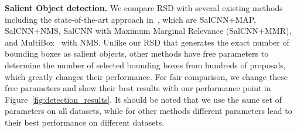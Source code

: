 \documentclass[10pt,twocolumn,letterpaper]{article}
\begin{document}
{\flushleft \textbf{Salient Object detection.}} We compare RSD with several existing methods including the state-of-the-art approach in~\cite{zhang2015SOD}, which are SalCNN+MAP, SalCNN+NMS, SalCNN with Maximum Marginal Relevance (SalCNN+MMR), and MultiBox~\cite{DBLP:conf/cvpr/ErhanSTA14} with NMS. 
Unlike our RSD that generates the exact number of bounding boxes as salient objects, other methods have free parameters to determine the number of selected bounding boxes from hundreds of proposals, which greatly changes their performance. 
For fair comparison, we change these free parameters and show their best results with our performance point in Figure~\ref{fig:detection_results}. 
It should be noted that we use the same set of parameters on all datasets, while for other methods different parameters lead to their best performance on different datasets. 
\end{document}

